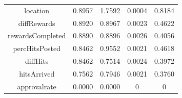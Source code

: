 \begin{table}[t!]
\begin{tabular}{|c|c|c|c|c|}
location             &  0.8957 &  1.7592 & 0.0004 & 0.8184 \\
diffRewards          &  0.8920 &  0.8967 & 0.0023 & 0.4622 \\
rewardsCompleted     &  0.8890 &  0.8896 & 0.0026 & 0.4056 \\
percHitsPosted       &  0.8462 &  0.9552 & 0.0021 & 0.4618 \\
diffHits             &  0.8462 &  0.7514 & 0.0024 & 0.3972 \\
hitsArrived          &  0.7562 &  0.7946 & 0.0021 & 0.3760 \\
approvalrate         &  0.0000 &  0.0000 & 0 & 0 \\
\hline
\end{tabular}
\label{table:feats}
\end{table}